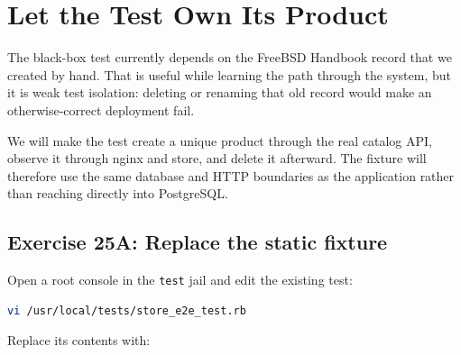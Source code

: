 \chapter{Let the Test Own Its Product}

The black-box test currently depends on the FreeBSD Handbook record that we
created by hand. That is useful while learning the path through the system,
but it is weak test isolation: deleting or renaming that old record would make
an otherwise-correct deployment fail.

We will make the test create a unique product through the real catalog API,
observe it through nginx and store, and delete it afterward. The fixture will
therefore use the same database and HTTP boundaries as the application rather
than reaching directly into PostgreSQL.

\section{Exercise 25A: Replace the static fixture}

Open a root console in the \texttt{test} jail and edit the existing test:

\begin{lstlisting}[language=sh]
vi /usr/local/tests/store_e2e_test.rb
\end{lstlisting}

Replace its contents with:

